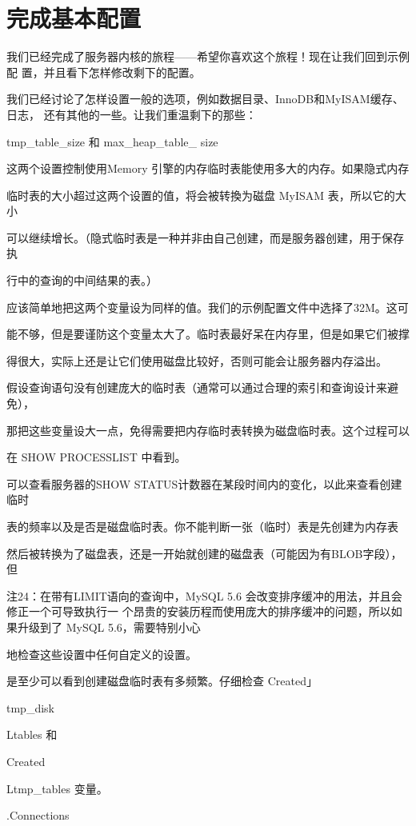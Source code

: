 \section{完成基本配置}
我们已经完成了服务器内核的旅程——希望你喜欢这个旅程！现在让我们回到示例配
置，并且看下怎样修改剩下的配置。

我们已经讨论了怎样设置一般的选项，例如数据目录、InnoDB和MyISAM缓存、日志，
还有其他的一些。让我们重温剩下的那些：

tmp\_table\_size 和 max\_heap\_table\_ size

这两个设置控制使用Memory 引擎的内存临时表能使用多大的内存。如果隐式内存

临时表的大小超过这两个设置的值，将会被转換为磁盘 MyISAM 表，所以它的大小

可以继续增长。（隐式临时表是一种并非由自己创建，而是服务器创建，用于保存执

行中的查询的中间结果的表。）

应该简单地把这两个变量设为同样的值。我们的示例配置文件中选择了32M。这可

能不够，但是要谨防这个变量太大了。临时表最好呆在内存里，但是如果它们被撑

得很大，实际上还是让它们使用磁盘比较好，否则可能会让服务器内存溢出。

假设查询语句没有创建庞大的临时表（通常可以通过合理的索引和查询设计来避免），

那把这些变量设大一点，免得需要把内存临时表转换为磁盘临时表。这个过程可以

在 SHOW PROCESSLIST 中看到。

可以查看服务器的SHOW STATUS计数器在某段时间内的变化，以此来查看创建临时

表的频率以及是否是磁盘临时表。你不能判断一张（临时）表是先创建为内存表

然后被转换为了磁盘表，还是一开始就创建的磁盘表（可能因为有BLOB字段），但

注24：在带有LIMIT语向的查询中，MySQL 5.6 会改变排序缓冲的用法，并且会修正一个可导致执行一
个昂贵的安装历程而使用庞大的排序缓冲的问题，所以如果升级到了 MySQL 5.6，需要特别小心

地检查这些设置中任何自定义的设置。

是至少可以看到创建磁盘临时表有多频繁。仔细检查 Created」

tmp\_disk

Ltables 和

Created

Ltmp\_tables 变量。

.Connections

